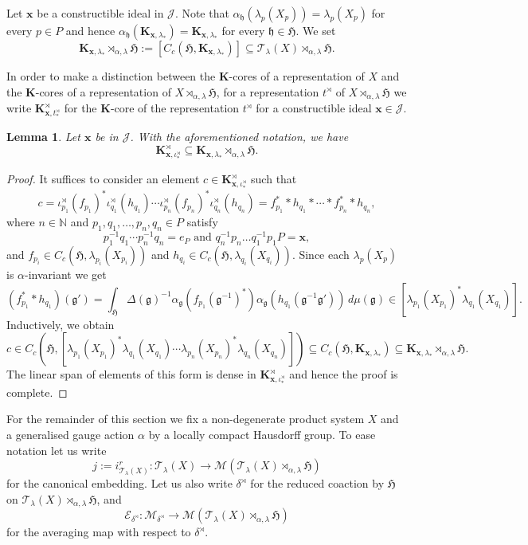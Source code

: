 \documentclass[11pt,final]{amsart}
\numberwithin{equation}{section}
\theoremstyle{plain}
\newtheorem{lemma}[theorem]{Lemma}
\theoremstyle{definition}
\theoremstyle{remark}
\newcommand{\E}{{\mathcal{E}}}
\newcommand{\J}{{\mathcal{J}}}
\newcommand{\M}{{\mathcal{M}}}
\newcommand{\T}{{\mathcal{T}}}
\def\al{\alpha}
\def\De{\Delta}
\def\de{\delta}
\def\io{\iota}
\def\la{\lambda}
\newcommand{\bN}{\mathbb{N}}
\newcommand{\fg}{{\mathfrak{g}}}
\newcommand{\fH}{{\mathfrak{H}}}
\newcommand{\fh}{{\mathfrak{h}}}
\newcommand{\bo}[1]{\mathbf{#1}} %
\begin{document}
Let $\bo{x}$ be a constructible ideal in $\J$. Note that $\al_{\fh}(\la_p(X_p))=\la_p(X_p)$ for every $p\in P$ and hence $\al_{\fh}(\bo{K}_{\bo{x},\la_\ast}) =\bo{K}_{\bo{x},\la_\ast}$ for every $\fh \in \fH$. We set
\[
\bo{K}_{\bo{x},\la_\ast}\rtimes_{\al,\la}\fH:=[C_c(\fH,\bo{K}_{\bo{x},\la_\ast})] \subseteq \T_\la(X)\rtimes_{\al,\la}\fH.
\]

In order to make a distinction between the $\bo{K}$-cores of a representation of $X$ and the $\bo{K}$-cores of a representation of $X\rtimes_{\al,\la}\fH$, for a representation $t^\rtimes$ of $X\rtimes_{\al,\la}\fH$ we write $\bo{K}^\rtimes_{\bo{x},t^\rtimes_\ast}$ for the $\bo{K}$-core of the representation $t^\rtimes$ for a constructible ideal $\bo{x}\in \J$.

\begin{lemma}\label{L:kcores}
Let $\bo{x}$ be in $\J$. With the aforementioned notation, we have
\[
\bo{K}^\rtimes_{\bo{x},\io^\rtimes_\ast} \subseteq \bo{K}_{\bo{x},\la_\ast}\rtimes_{\al,\la}\fH.
\]
\end{lemma}

\begin{proof}
It suffices to consider an element $c\in \bo{K}^\rtimes_{\bo{x},\io^\rtimes_\ast}$ such that
\[
c=\io^\rtimes_{p_1}(f_{p_1})^* \io^\rtimes_{q_1}(h_{q_1})\cdots \io^\rtimes_{p_n}(f_{p_n})^* \io^\rtimes_{q_n}(h_{q_n})=f_{p_1}^* \ast h_{q_1} \ast \cdots \ast f_{p_n}^* \ast h_{q_n},
\]
where $n\in \bN$ and $p_1, q_1, \dots, p_n, q_n \in P$ satisfy
\[
p_1^{-1} q_1 \cdots p_n^{-1} q_n = e_P
\text{ and }
q_n^{-1} p_n \dots q_1^{-1} p_1 P = \bo{x},
\]
and $f_{p_i} \in C_c(\fH,\la_{p_i}(X_{p_i}))$ and $h_{q_i}\in C_c(\fH,\la_{q_i}(X_{q_i}))$. Since each $\la_p(X_p)$ is $\al$-invariant we get
\[
(f_{p_1}^* \ast h_{q_1})(\fg')= \int_{\fH} \De(\fg)^{-1} \al_\fg(f_{p_1}(\fg^{-1})^*) \al_\fg(h_{q_1}(\fg^{-1} \fg')) \, d\mu(\fg) \in [\la_{p_1}(X_{p_1})^* \la_{q_1}(X_{q_1})].
\]
Inductively, we obtain
\[
c\in C_c(\fH,[\la_{p_1}(X_{p_1})^* \la_{q_1}(X_{q_1})\cdots \la_{p_n}(X_{p_n})^* \la_{q_n}(X_{q_n})])\subseteq C_c(\fH, \bo{K}_{\bo{x},\la_\ast}) \subseteq \bo{K}_{\bo{x},\la_\ast}\rtimes_{\al,\la}\fH.
\]
The linear span of elements of this form is dense in $ \bo{K}^\rtimes_{\bo{x},\io^\rtimes_\ast}$ and hence the proof is complete.
\end{proof}

For the remainder of this section we fix a non-degenerate product system $X$ and a generalised gauge action $\al$ by a locally compact Hausdorff group. To ease notation let us write
\[
j:=i^r_{\T_\la(X)} \colon \T_\la(X) \to \M(\T_\la(X)\rtimes_{\al,\la}\fH)
\]
for the canonical embedding. Let us also write $\de^{\rtimes}$ for the reduced coaction by $\fH$ on $\T_\la(X)\rtimes_{\al,\la}\fH$, and
\[
\E_{\de^{\rtimes}}\colon \M_{\de^{\rtimes}} \to \M(\T_\la(X)\rtimes_{\al,\la}\fH)
\]
for the averaging map with respect to $\de^\rtimes$.
\end{document}
